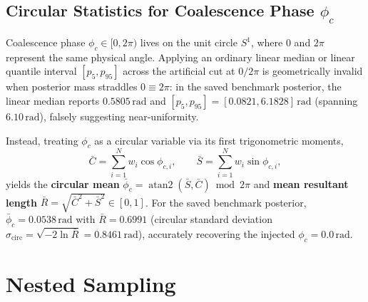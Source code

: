 \documentclass[11pt,a4paper]{report}
\begin{document}
\section{Circular Statistics for Coalescence Phase \texorpdfstring{$\phi_c$}{phi\_c}}
Coalescence phase $\phi_c \in [0, 2\pi)$ lives on the unit circle $S^1$, where $0$ and $2\pi$ represent the same physical angle. Applying an ordinary linear median or linear quantile interval $[p_5, p_{95}]$ across the artificial cut at $0 / 2\pi$ is geometrically invalid when posterior mass straddles $0 \equiv 2\pi$: in the saved benchmark posterior, the linear median reports $0.5805\,\mathrm{rad}$ and $[p_5, p_{95}] = [0.0821, 6.1828]\,\mathrm{rad}$ (spanning $6.10\,\mathrm{rad}$), falsely suggesting near-uniformity.

Instead, treating $\phi_c$ as a circular variable via its first trigonometric moments,
\begin{equation}
\bar{C} = \sum_{i=1}^{N} w_i \cos\phi_{c,i}, \qquad \bar{S} = \sum_{i=1}^{N} w_i \sin\phi_{c,i},
\end{equation}
yields the \textbf{circular mean} $\bar{\phi}_c = \operatorname{atan2}(\bar{S}, \bar{C}) \bmod 2\pi$ and \textbf{mean resultant length} $\bar{R} = \sqrt{\bar{C}^2 + \bar{S}^2} \in [0, 1]$. For the saved benchmark posterior, $\bar{\phi}_c = 0.0538\,\mathrm{rad}$ with $\bar{R} = 0.6991$ (circular standard deviation $\sigma_{\mathrm{circ}} = \sqrt{-2\ln \bar{R}} = 0.8461\,\mathrm{rad}$), accurately recovering the injected $\phi_c = 0.0\,\mathrm{rad}$.

\chapter{Nested Sampling}
\end{document}
